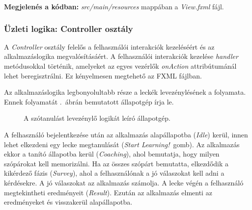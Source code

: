 \documentclass[11pt, a4paper]{article}
\begin{document}
 	\vspace{3mm}
 	\textbf{Megjelenés a kódban:} \textit{src/main/resources} mappában a \textit{View.fxml} fájl.
   
     \subsubsection{Üzleti logika: Controller osztály}
     A \textsl{Controller} osztály felelős a felhasználói interakciók kezeléséért és az alkalmazáslogika megvalósításáért. A felhasználói interakciók kezelése \emph{handler} metódusokkal történik, amelyeket az egyes vezérlők \emph{onAction} attribútumánál lehet beregisztrálni. Ez kényelmesen megtehető az FXML fájlban.
     
     Az alkalmazáslogika legbonyolultabb része a leckék levezénylésének a folyamata. Ennek folyamatát .~ábrán bemutatott állapotgép írja le.
     \begin{figure}[h!]
     	\center
     	\caption{A szótanulást levezénylő logikát leíró állapotgép.}
     	\label{fig:business-logic}
     \end{figure}
 
 	A felhasználó bejelentkezése után az alkalmazás alapállapotba (\emph{Idle}) kerül, innen lehet elkezdeni egy lecke megtanulását (\emph{Start Learning!}~gomb). Az alkalmazás ekkor a tanító állapotba kerül (\emph{Coaching}), ahol bemutatja, hogy milyen szópárokat kell memorizálni. Ha az összes szópárt bemutatta, elkezdődik a kikérdező fázis (\emph{Survey}), ahol a felhasználónak a jó válaszokat kell adni a kérdésekre. A jó válaszokat az alkalmazás számolja. A lecke végén a felhasználó megtekintheti eredményeit (\emph{Result}). Ezután az alkalmazás elmenti az eredményeket és visszakerül alapállapotba.
     
\end{document}
